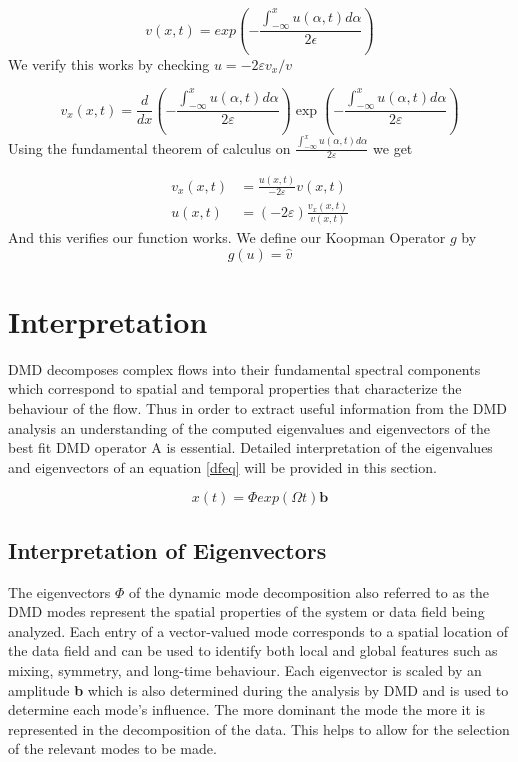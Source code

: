 \documentclass[12pt]{report}
\begin{document}
\begin{equation}
v(x,t)=exp\left(-\dfrac{\int_{-\infty}^{x}u(\alpha,t)d\alpha}{2\epsilon}\right)
\end{equation}
We verify this works by checking $u=-2\varepsilon v_{x}/v$

\begin{equation}
v_{x}(x,t)=\frac{d}{dx}\left( -\frac{\int_{-\infty }^{x}u(\alpha
,t)d\alpha}{2\varepsilon}\right) \exp \left( -\frac{\int_{-\infty}^{x}u(\alpha,t)d\alpha }{2\varepsilon }\right) 
\end{equation}
Using the fundamental theorem of calculus on $\frac{\int_{-\infty
}^{x}u(\alpha,t)d\alpha}{2\varepsilon}$ we get

\begin{equation}
\begin{aligned}
        v_{x}(x,t) &=\frac{u(x,t)}{-2\varepsilon }v(x,t) \\
        u(x,t) &=(-2\varepsilon)\frac{v_{x}(x,t)}{v(x,t)}
    \end{aligned}
\end{equation}
And this verifies our function works. We define our Koopman Operator $g$ by
\begin{equation}
g(u)=\widehat{v}
\end{equation}


\chapter{Interpretation}
DMD decomposes complex flows into their fundamental spectral components which correspond to spatial and temporal properties that characterize the behaviour of the flow. Thus in order to extract useful information from the DMD analysis an understanding of the computed eigenvalues and eigenvectors of the best fit DMD operator A is essential. Detailed interpretation of the eigenvalues and eigenvectors of an equation \eqref{dfeq} will be provided in this section.

\begin{equation}\label{dfeq}
    x(t)={\Phi}exp(\Omega{t}){\textbf{b}}
\end{equation}

\section{Interpretation of Eigenvectors}
The eigenvectors $\Phi$ of the dynamic mode decomposition also referred to as the DMD modes represent the spatial properties of the system or data field being analyzed. Each entry of a vector-valued mode corresponds to a spatial location of the data field and can be used to identify both local and global features such as mixing, symmetry, and long-time behaviour. Each eigenvector is scaled by an amplitude \textbf{b} which is also determined during the analysis by DMD and is used to determine each mode's influence. The more dominant the mode the more it is represented in the decomposition of the data. This helps to allow for the selection of the relevant modes to be made. 
\end{document}
